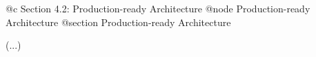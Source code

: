 @c Section 4.2: Production-ready Architecture
@node Production-ready Architecture
@section Production-ready Architecture

(...)
